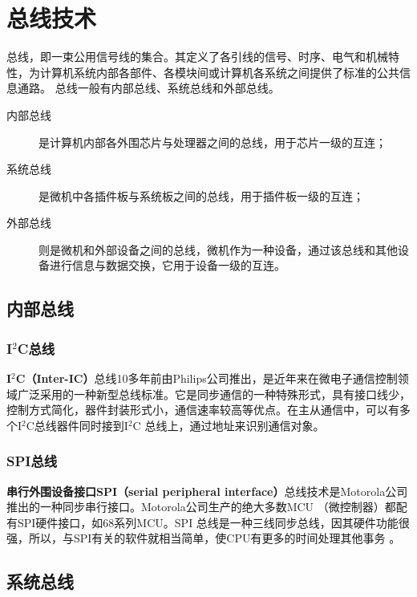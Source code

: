 \chapter{总线技术}

总线，即一束公用信号线的集合。其定义了各引线的信号、时序、电气和机械特性，为计算机系统内部各部件、各模块间或计算机各系统之间提供了标准的公共信息通路。
总线一般有内部总线、系统总线和外部总线。
       \begin{description}
             \item[内部总线] 是计算机内部各外围芯片与处理器之间的总线，用于芯片一级的互连；
             \item[系统总线]        是微机中各插件板与系统板之间的总线，用于插件板一级的互连；

             \item[外部总线]        则是微机和外部设备之间的总线，微机作为一种设备，通过该总线和其他设备进行信息与数据交换，它用于设备一级的互连。

           \end{description}




\section{内部总线}

\subsection{I$^2$C总线}

\textbf{I$^2$C（Inter-IC）}总线10多年前由Philips公司推出，是近年来在微电子通信控制领域广泛采用的一种新型总线标准。它是同步通信的一种特殊形式，具有接口线少，控制方式简化，器件封装形式小，通信速率较高等优点。在主从通信中，可以有多个I$^2$C总线器件同时接到I$^2$C 总线上，通过地址来识别通信对象。

\subsection{SPI总线}

\textbf{串行外围设备接口SPI（serial peripheral interface）}总线技术是Motorola公司推出的一种同步串行接口。Motorola公司生产的绝大多数MCU （微控制器）都配有SPI硬件接口，如68系列MCU。SPI 总线是一种三线同步总线，因其硬件功能很强，所以，与SPI有关的软件就相当简单，使CPU有更多的时间处理其他事务 。


\section{系统总线}


